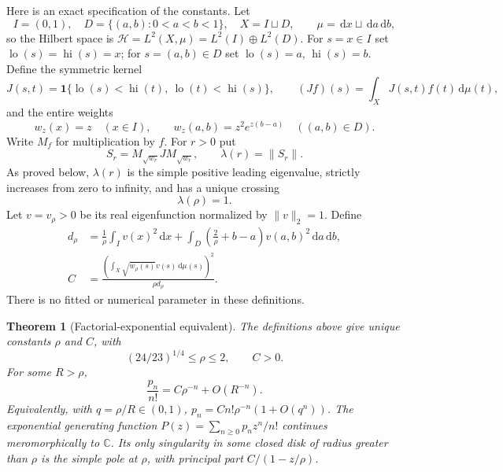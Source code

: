 \documentclass[11pt,letterpaper]{article}
\numberwithin{equation}{section}
\newtheorem{theorem}{Theorem}[section]
\theoremstyle{remark}\newtheorem{remark}[theorem]{Remark}
\newcommand{\dd}{\,\mathrm d}
\newcommand{\one}{\mathbf1}
\newcommand{\CC}{\mathbb C}
\newcommand{\lo}{\operatorname{lo}}
\newcommand{\hi}{\operatorname{hi}}
\begin{document}
Here is an exact specification of the constants. Let
\[
 I=(0,1),\quad D=\{(a,b):0<a<b<1\},\quad X=I\sqcup D,
 \qquad \mu=\dd x\sqcup\dd a\dd b,
\]
so the Hilbert space is $\mathcal H=L^2(X,\mu)=L^2(I)\oplus L^2(D)$.
For $s=x\in I$ set $\lo(s)=\hi(s)=x$; for $s=(a,b)\in D$ set
$\lo(s)=a$, $\hi(s)=b$. Define the symmetric kernel
\begin{equation}\label{psp:op:eq:kernel}
 J(s,t)=\one\{\lo(s)<\hi(t),\ \lo(t)<\hi(s)\},
 \qquad (Jf)(s)=\int_X J(s,t)f(t)\dd\mu(t),
\end{equation}
and the entire weights
\begin{equation}\label{psp:op:eq:weights}
 w_z(x)=z\quad(x\in I),\qquad
 w_z(a,b)=z^2e^{z(b-a)}\quad((a,b)\in D).
\end{equation}
Write $M_f$ for multiplication by $f$. For $r>0$ put
\[
 S_r=M_{\sqrt{w_r}}JM_{\sqrt{w_r}},\qquad \lambda(r)=\|S_r\|.
\]
As proved below, $\lambda(r)$ is the simple positive leading eigenvalue,
strictly increases from zero to infinity, and has a unique crossing
\begin{equation}\label{psp:op:eq:rho}
 \lambda(\rho)=1.
\end{equation}
Let $v=v_\rho>0$ be its real eigenfunction normalized by $\|v\|_2=1$.
Define
\begin{align}
 d_\rho&=\frac1\rho\int_I v(x)^2\dd x
       +\int_D\left(\frac2\rho+b-a\right)v(a,b)^2\dd a\dd b,
       \label{psp:op:eq:derivative}\\
 C&=\frac{\left(\int_X\sqrt{w_\rho(s)}v(s)\dd\mu(s)\right)^2}
             {\rho d_\rho}.\label{psp:op:eq:amplitude}
\end{align}
There is no fitted or numerical parameter in these definitions.

\begin{theorem}[Factorial-exponential equivalent]\label{psp:op:thm:main}
The definitions above give unique constants $\rho$ and $C$, with
\begin{equation}\label{psp:op:eq:rhobounds}
 (24/23)^{1/4}\leq\rho\leq2,\qquad C>0.
\end{equation}
For some $R>\rho$,
\begin{equation}\label{psp:op:eq:main}
 \frac{p_n}{n!}=C\rho^{-n}+O(R^{-n}).
\end{equation}
Equivalently, with $q=\rho/R\in(0,1)$,
$p_n=Cn!\rho^{-n}(1+O(q^n))$.
The exponential generating function
$P(z)=\sum_{n\geq0}p_nz^n/n!$ continues meromorphically to $\CC$.
Its only singularity in some closed disk of radius greater than
$\rho$ is the simple pole at $\rho$, with principal part
$C/(1-z/\rho)$.
\end{theorem}
\end{document}
